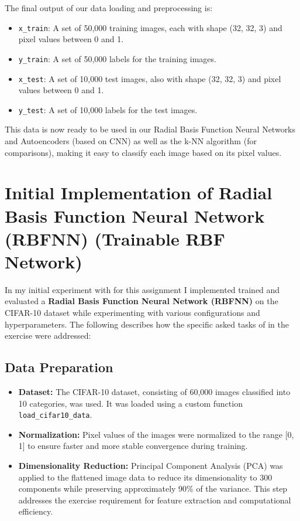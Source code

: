 \documentclass[lettersize,journal]{IEEEtran}
\begin{document}
The final output of our data loading and preprocessing is:
\begin{itemize}
    \item \texttt{x\_train}: A set of 50,000 training images, each with shape (32, 32, 3) and pixel values between 0 and 1.
    \item \texttt{y\_train}: A set of 50,000 labels for the training images.
    \item \texttt{x\_test}: A set of 10,000 test images, also with shape (32, 32, 3) and pixel values between 0 and 1.
    \item \texttt{y\_test}: A set of 10,000 labels for the test images.
\end{itemize}
\vspace{0.3cm}
This data is now ready to be used in our Radial Basis Function Neural Networks and Autoencoders (based on CNN) as well as the k-NN algorithm (for comparisons), making it easy to classify each image based on its pixel values.

\section{\textbf{Initial Implementation of Radial Basis Function Neural Network (RBFNN) (Trainable RBF Network)}}
In my initial experiment with for this assignment I implemented trained and evaluated a \textbf{Radial Basis Function Neural Network (RBFNN)} on the CIFAR-10 dataset while experimenting with various configurations and hyperparameters. The following describes how the specific asked tasks of in the exercise were addressed:

\subsection{\textbf{Data Preparation}}
\begin{itemize}
    \item \textbf{Dataset:} The CIFAR-10 dataset, consisting of 60,000 images classified into 10 categories, was used. It was loaded using a custom function \texttt{load\_cifar10\_data}.
    \item \textbf{Normalization:} Pixel values of the images were normalized to the range [0, 1] to ensure faster and more stable convergence during training.
    \item \textbf{Dimensionality Reduction:} 
    Principal Component Analysis (PCA) was applied to the flattened image data to reduce its dimensionality to 300 components while preserving approximately 90\% of the variance. This step addresses the exercise requirement for feature extraction and computational efficiency.
\end{itemize}
\end{document}
